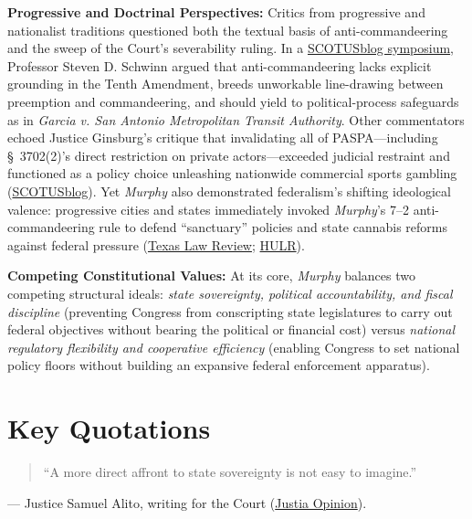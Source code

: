 \documentclass[12pt]{article}
\begin{document}
\textbf{Progressive and Doctrinal Perspectives:} Critics from progressive and nationalist traditions questioned both the textual basis of anti-commandeering and the sweep of the Court's severability ruling. In a \href{https://www.scotusblog.com/2017/08/symposium-time-abandon-anti-commandeering-dont-count-supreme-court/}{SCOTUSblog symposium}, Professor Steven D. Schwinn argued that anti-commandeering lacks explicit grounding in the Tenth Amendment, breeds unworkable line-drawing between preemption and commandeering, and should yield to political-process safeguards as in \textit{Garcia v. San Antonio Metropolitan Transit Authority}. Other commentators echoed Justice Ginsburg's critique that invalidating all of PASPA---including \S~3702(2)'s direct restriction on private actors---exceeded judicial restraint and functioned as a policy choice unleashing nationwide commercial sports gambling (\href{https://www.scotusblog.com/2018/05/opinion-analysis-justices-strike-down-federal-sports-gambling-law/}{SCOTUSblog}). Yet \textit{Murphy} also demonstrated federalism's shifting ideological valence: progressive cities and states immediately invoked \textit{Murphy}'s 7--2 anti-commandeering rule to defend ``sanctuary'' policies and state cannabis reforms against federal pressure (\href{https://texaslawreview.org/making-federalism-great-again/}{Texas Law Review}; \href{https://hulr.org/spring-2022/murphy-v-ncaa}{HULR}).

\textbf{Competing Constitutional Values:} At its core, \textit{Murphy} balances two competing structural ideals: \textit{state sovereignty, political accountability, and fiscal discipline} (preventing Congress from conscripting state legislatures to carry out federal objectives without bearing the political or financial cost) versus \textit{national regulatory flexibility and cooperative efficiency} (enabling Congress to set national policy floors without building an expansive federal enforcement apparatus).

\section{Key Quotations}

\begin{quote}
``A more direct affront to state sovereignty is not easy to imagine.''
\end{quote}
\noindent --- Justice Samuel Alito, writing for the Court (\href{https://supreme.justia.com/cases/federal/us/584/16-476/}{Justia Opinion}).
\end{document}
